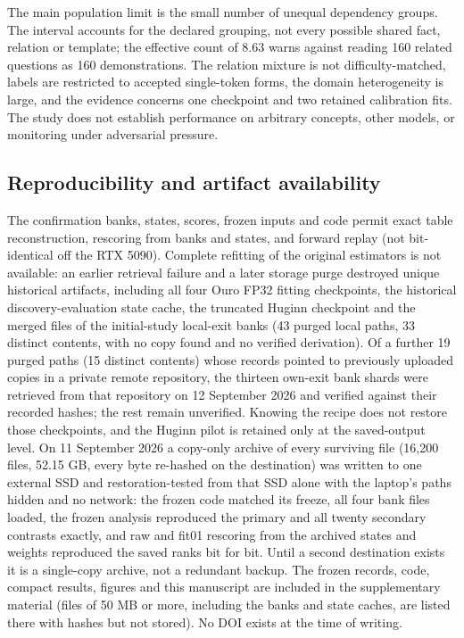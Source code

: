 The main population limit is the small number of unequal dependency
groups. The interval accounts for the declared grouping, not every
possible shared fact, relation or template; the effective count of 8.63
warns against reading 160 related questions as 160 demonstrations. The
relation mixture is not difficulty-matched, labels are restricted to
accepted single-token forms, the domain heterogeneity is large, and the
evidence concerns one checkpoint and two retained calibration fits. The
study does not establish performance on arbitrary concepts, other
models, or monitoring under adversarial pressure.

\subsection{Reproducibility and artifact
availability}\label{reproducibility-and-artifact-availability}

The confirmation banks, states, scores, frozen inputs and code permit
exact table reconstruction, rescoring from banks and states, and forward
replay (not bit-identical off the RTX 5090). Complete refitting of the
original estimators is not available: an earlier retrieval failure and a
later storage purge destroyed unique historical artifacts, including all
four Ouro FP32 fitting checkpoints, the historical discovery-evaluation
state cache, the truncated Huginn checkpoint and the merged files of the
initial-study local-exit banks (43 purged local paths, 33 distinct
contents, with no copy found and no verified derivation). Of a further
19 purged paths (15 distinct contents) whose records pointed to
previously uploaded copies in a private remote repository, the thirteen
own-exit bank shards were retrieved from that repository on 12 September
2026 and verified against their recorded hashes; the rest remain
unverified. Knowing the recipe does not restore those checkpoints, and
the Huginn pilot is retained only at the saved-output level. On 11
September 2026 a copy-only archive of every surviving file (16,200
files, 52.15 GB, every byte re-hashed on the destination) was written to
one external SSD and restoration-tested from that SSD alone with the
laptop's paths hidden and no network: the frozen code matched its
freeze, all four bank files loaded, the frozen analysis reproduced the
primary and all twenty secondary contrasts exactly, and raw and fit01
rescoring from the archived states and weights reproduced the saved
ranks bit for bit. Until a second destination exists it is a single-copy
archive, not a redundant backup. The frozen records, code, compact
results, figures and this manuscript are included in the supplementary material (files of 50 MB or more, including the banks and state caches, are listed there with hashes but not stored). No DOI exists at the time of writing.

